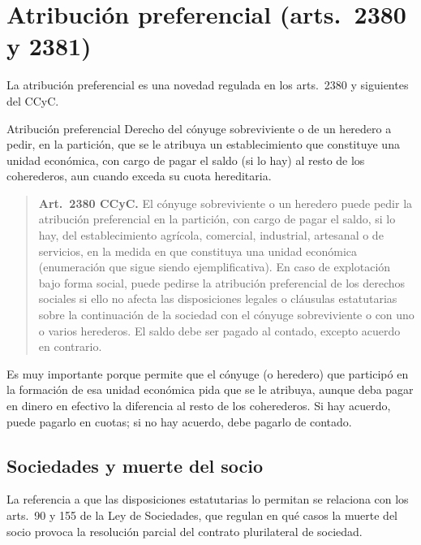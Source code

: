 \documentclass[12pt,oneside]{book}
\begin{document}
\section{Atribución preferencial (arts.~2380 y 2381)}

La atribución preferencial es una novedad regulada en los arts.~2380 y siguientes del CCyC.

\begin{definition}{Atribución preferencial}
Derecho del cónyuge sobreviviente o de un heredero a pedir, en la partición, que se le atribuya un establecimiento que constituye una unidad económica, con cargo de pagar el saldo (si lo hay) al resto de los coherederos, aun cuando exceda su cuota hereditaria.
\end{definition}

\begin{quote}
\textbf{Art.~2380 CCyC.} El cónyuge sobreviviente o un heredero puede pedir la atribución preferencial en la partición, con cargo de pagar el saldo, si lo hay, del establecimiento agrícola, comercial, industrial, artesanal o de servicios, en la medida en que constituya una unidad económica (enumeración que sigue siendo ejemplificativa). En caso de explotación bajo forma social, puede pedirse la atribución preferencial de los derechos sociales si ello no afecta las disposiciones legales o cláusulas estatutarias sobre la continuación de la sociedad con el cónyuge sobreviviente o con uno o varios herederos. El saldo debe ser pagado al contado, excepto acuerdo en contrario.
\end{quote}

Es muy importante porque permite que el cónyuge (o heredero) que participó en la formación de esa unidad económica pida que se le atribuya, aunque deba pagar en dinero en efectivo la diferencia al resto de los coherederos. Si hay acuerdo, puede pagarlo en cuotas; si no hay acuerdo, debe pagarlo de contado.

\subsection{Sociedades y muerte del socio}

La referencia a que las disposiciones estatutarias lo permitan se relaciona con los arts.~90 y 155 de la Ley de Sociedades, que regulan en qué casos la muerte del socio provoca la resolución parcial del contrato plurilateral de sociedad.
\end{document}
